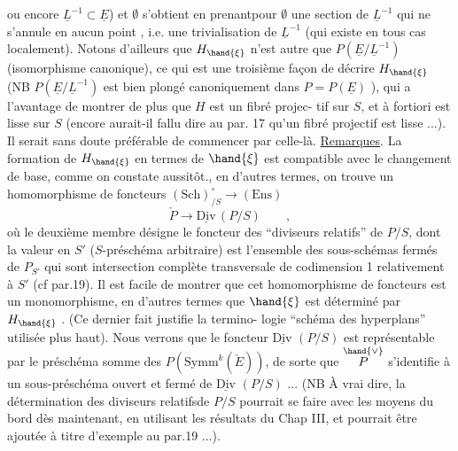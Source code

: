 
ou encore $\underline{L}^{-1}\subset\underline{E}$) et $\emptyset$ s'obtient en prenantpour $\emptyset$ une section de $\underline{L}^{-1}$ qui
ne s'annule en aucun point , i.e. une trivialisation de $\underline{L}^{-1}$
(qui existe en tous cas localement). Notons d'ailleurs que $H_{\hand{\xi}}$ n'est
autre que $P(\underline{E}/\underline{L}^{-1})$ (isomorphisme canonique), ce qui est une troisième
façon de décrire $H_{\hand{\xi}}$ (NB $P(\underline{E}/\underline{L}^{-1})$ est bien plongé canoniquement dans
$P = P(\underline{E})$ ), qui a l'avantage de montrer de plus que $H$ est un fibré projec-%
tif sur $S$, et à fortiori est lisse sur $S$ (encore aurait-il fallu dire 
\placedmargin{$\|$} au par. 17 qu'un fibré projectif est lisse ...). Il serait sans doute
\placedmargin{$\|$} préférable de commencer par celle-là.
\uline{Remarques}. La formation de $H_{\hand{\xi}}$ en termes de $\hand{\xi}$ est compatible avec
le changement de base, comme on constate aussitôt., en d'autres termes,
on trouve un homomorphisme de foncteurs $(\mathrm{Sch})^{\circ}_{/S}\to(\mathrm{Ens})$
\[ \check{P} \longrightarrow \underline{\mathrm{Div}}\,(P/S) \qquad , \]
où le deuxième membre désigne le foncteur des ``diviseurs relatifs'' de $P/S$,
dont la valeur en $S'$ ($S$-préschéma arbitraire) est l'ensemble des
sous-schémas fermés de $P_{S'}$ qui sont intersection complète transversale
de codimension 1 relativement à $S'$ (cf par.19). Il est facile de montrer
que cet homomorphisme de foncteurs est un monomorphisme, en d'autres
termes que $\hand{\xi}$ est déterminé par $H_{\hand{\xi}}$ . (Ce dernier fait justifie la termino-%
logie ``schéma des hyperplans'' utilisée plus haut). Nous verrons  \placedmargin{)}
 que le foncteur $\underline{\mathrm{Div}}$ $(P/S)$ est représentable par le préschéma somme
des $P(\mathrm{Symm}^{k}(\check{E}))$, de sorte que $\overset{\hand{\vee}}{P}$ s'identifie à un sous-préschéma ouvert
et fermé de $\underline{\mathrm{Div}}$ $(P/S)$ ... (NB À vrai dire, la détermination des diviseurs
\placedmargin{$|$} relatifsde $P/S$ pourrait se faire avec les moyens du bord dès maintenant, en
\placedmargin{$|$} utilisant les résultats du Chap III, et pourrait être ajoutée  à titre
\placedmargin{$|$} d'exemple au par.19 ...).

